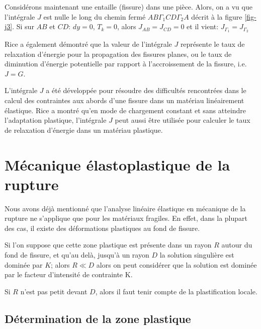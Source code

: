 \medskipvm
Considérons maintenant une entaille (fissure) dans une pièce.
Alors, on a vu que l'intégrale $J$ est nulle le long du chemin fermé $AB\Gamma_1CD\Gamma_2A$ décrit
à la figure \ref{fig-j3}.
Si sur $AB$ et $CD$: $dy=0$, $T_k=0$, alors $J_{AB}=J_{CD}=0$
et il vient: $J_{\Gamma_1} = J_{\Gamma_2}$

\medskip
Rice a également démontré que la valeur de
l'intégrale $J$ représente le taux de relaxation
d'énergie pour la propagation des fissures planes,
ou le taux de diminution d'énergie potentielle par rapport à l'accroissement de la fissure, i.e. $J=G$.

\medskip
L'intégrale $J$ a été développée pour résoudre des difficultés rencontrées dans le calcul des
contraintes aux abords d'une fissure dans un matériau linéairement élastique.
Rice a montré qu'en mode de chargement constant et
sans atteindre l'adaptation plastique, l'intégrale $J$ peut aussi être utilisée pour
calculer le taux de relaxation d'énergie dans un matériau plastique.






\medskip
\section{Mécanique élastoplastique de la rupture}

Nous avons déjà mentionné que l'analyse linéaire élastique en mécanique de la rupture
ne s'applique que pour les matériaux fragiles.
En effet, dans la plupart des cas, il existe des déformations plastiques au fond de
fissure.

Si l'on suppose que cette zone plastique est présente dans un rayon $R$ autour
du fond de fissure, et qu'au delà, jusqu'à un rayon $D$ la solution singulière est
dominée par $K$; alors $R \ll D$ alors on peut considérer que la solution est dominée
par le facteur d'intensité de contrainte K.

Si $R$ n'est pas petit devant $D$, alors il faut tenir compte de la plastification locale.

\medskip
\subsection{Détermination de la zone plastique}

